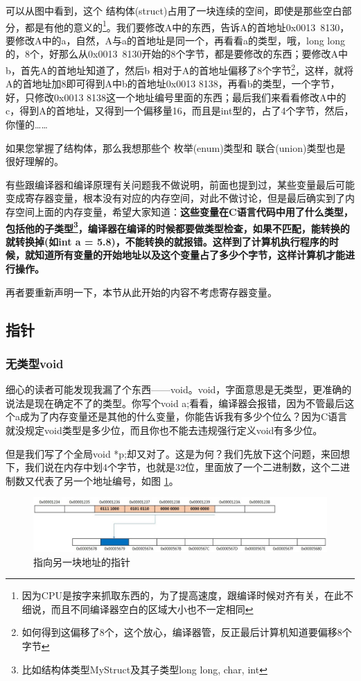 \documentclass[11pt,twoside,a4paper,titlepage]{article}	%
\newcommand{\kw}[1]{\textcolor[rgb]{0.0,0.0,0.63}{ #1}}
\begin{document}
可以从图中看到，这个\kw{结构体(struct)}占用了一块连续的空间，即使是那些空白部分，都是有他的意义的\footnote{因为CPU是按字来抓取东西的，为了提高速度，跟编译时候对齐有关，在此不细说，而且不同编译器空白的区域大小也不一定相同}。我们要修改A中的东西，告诉A的首地址0x0013\ 8130，要修改A中的a，自然，A与a的首地址是同一个，再看看a的类型，哦，long long 的，8个，好那么从0x0013\ 8130开始的8个字节，都是要修改的东西；要修改A中b，首先A的首地址知道了，然后b 相对于A的首地址偏移了8个字节\footnote{如何得到这偏移了8个，这个放心，编译器管，反正最后计算机知道要偏移8个字节}，这样，就将A的首地址加8即可得到A中b的首地址0x0013 8138，再看b的类型，一个字节，好，只修改0x0013 8138这一个地址编号里面的东西；最后我们来看看修改A中的c，得到A的首地址，又得到一个偏移量16，而且是int型的，占了4个字节，然后，你懂的……

如果您掌握了结构体，那么我想那些个\kw{枚举(enum)}类型和\kw{联合(union)}类型也是很好理解的。

有些跟编译器和编译原理有关问题我不做说明，前面也提到过，某些变量最后可能变成寄存器变量，根本没有对应的内存空间，对此不做讨论，但是最后确实到了内存空间上面的内存变量，希望大家知道：\textbf{这些变量在C语言代码中用了什么类型，包括他的子类型\footnote{比如结构体类型MyStruct及其子类型long long, char, int}，编译器在编译的时候都要做类型检查，如果不匹配，能转换的就转换掉(如int a = 5.8)，不能转换的就报错。这样到了计算机执行程序的时候，就知道所有变量的开始地址以及这个变量占了多少个字节，这样计算机才能进行操作。}

再者要重新声明一下，本节从此开始的内容不考虑寄存器变量。

\subsection{指针}

\subsubsection{无类型void}
细心的读者可能发现我漏了个东西——void。void，字面意思是无类型，更准确的说法是现在确定不了的类型。你写个void a;看看，编译器会报错，因为不管最后这个a成为了内存变量还是其他的什么变量，你能告诉我有多少个位么？因为C语言就没规定void类型是多少位，而且你也不能去违规强行定义void有多少位。

但是我们写了个全局void *p;却又对了。这是为何？我们先放下这个问题，来回想下，我们说在内存中划4个字节，也就是32位，里面放了一个二进制数，这个二进制数又代表了另一个地址编号，如图 \ref{fig:pointer_01}。

\begin{figure}[H]
\centering
\includegraphics[scale=.5]{../src/pointer_01.jpg}
\caption{指向另一块地址的指针}
\label{fig:pointer_01}
\end{figure}
\end{document}
